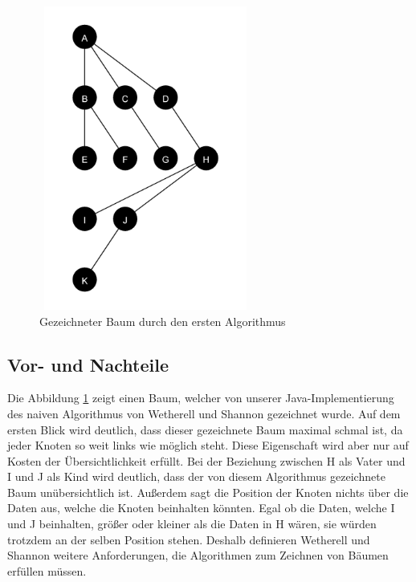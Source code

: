 \begin{figure}[H]
    \centering
    \includegraphics[width=7cm, height=10cm]{abbildungen/baum_algo_1}
    \caption{Gezeichneter Baum durch den ersten Algorithmus}
    \label{pic:baum_algo_1} 
\end{figure}

\subsection{Vor- und Nachteile}
Die Abbildung \ref{pic:baum_algo_1} zeigt einen Baum, welcher von unserer Java-Implementierung des naiven Algorithmus von Wetherell und Shannon
gezeichnet wurde.
Auf dem ersten Blick wird deutlich, dass dieser gezeichnete Baum maximal schmal ist, da jeder Knoten so weit links wie möglich steht.
Diese Eigenschaft wird aber nur auf Kosten der Übersichtlichkeit erfüllt. Bei der Beziehung zwischen H als Vater und I und J als Kind wird 
deutlich, dass der von diesem Algorithmus gezeichnete Baum unübersichtlich ist. Außerdem sagt die Position der Knoten nichts über die Daten 
aus, welche die Knoten beinhalten könnten. Egal ob die Daten, welche I und J beinhalten, größer oder kleiner als die Daten in H wären, 
sie würden trotzdem an der selben Position stehen. 
Deshalb definieren Wetherell und Shannon weitere Anforderungen, die Algorithmen zum Zeichnen von Bäumen erfüllen müssen.

